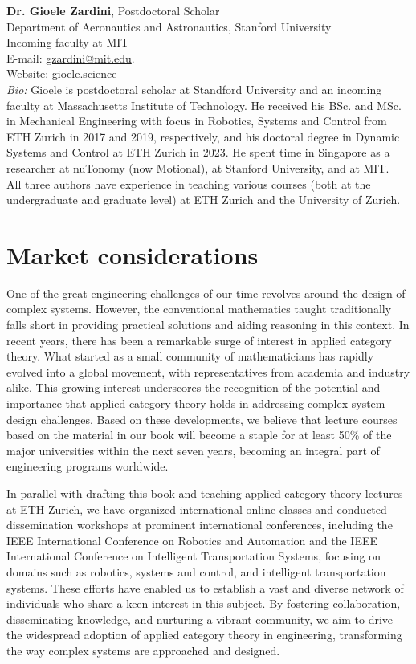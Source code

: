 \documentclass[10pt, article, one side]{memoir}
\begin{document}
    \noindent \textbf{Dr.
        Gioele Zardini}, Postdoctoral Scholar\\
    Department of Aeronautics and Astronautics, Stanford University\\
    Incoming faculty at MIT\\
    E-mail: \href{mailto:gzardini@mit.edu}{gzardini@mit.edu}.
    \\
    Website: \href{https://gioele.science}{gioele.science}\\
    \emph{Bio:}
    Gioele is postdoctoral scholar at Standford University and an incoming faculty at Massachusetts Institute of Technology.
    He received his BSc.
    and MSc. in Mechanical Engineering with focus in Robotics, Systems and Control from ETH Zurich in 2017 and 2019, respectively, and his doctoral degree in Dynamic Systems and Control at ETH Zurich in 2023.
    He spent time in Singapore as a researcher at nuTonomy (now Motional), at Stanford University, and at MIT.
    \\

    All three authors have experience in teaching various courses (both at the undergraduate and graduate level) at ETH Zurich and the University of Zurich.

    \section{Market considerations}
    One of the great engineering challenges of our time revolves around the design of complex systems.
    However, the conventional mathematics taught traditionally falls short in providing practical solutions and aiding reasoning in this context.
    In recent years, there has been a remarkable surge of interest in applied category theory.
    What started as a small community of mathematicians has rapidly evolved into a global movement, with representatives from academia and industry alike.
    This growing interest underscores the recognition of the potential and importance that applied category theory holds in addressing complex system design challenges.
    Based on these developments, we believe that lecture courses based on the material in our book will become a staple for at least 50\% of the major universities within the next seven years, becoming an integral part of engineering programs worldwide.

    In parallel with drafting this book and teaching applied category theory lectures at ETH Zurich, we have organized international online classes and conducted dissemination workshops at prominent international conferences, including the IEEE International Conference on Robotics and Automation and the IEEE International Conference on Intelligent Transportation Systems, focusing on domains such as robotics, systems and control, and intelligent transportation systems.
    These efforts have enabled us to establish a vast and diverse network of individuals who share a keen interest in this subject.
    By fostering collaboration, disseminating knowledge, and nurturing a vibrant community, we aim to drive the widespread adoption of applied category theory in engineering, transforming the way complex systems are approached and designed.
\end{document}
